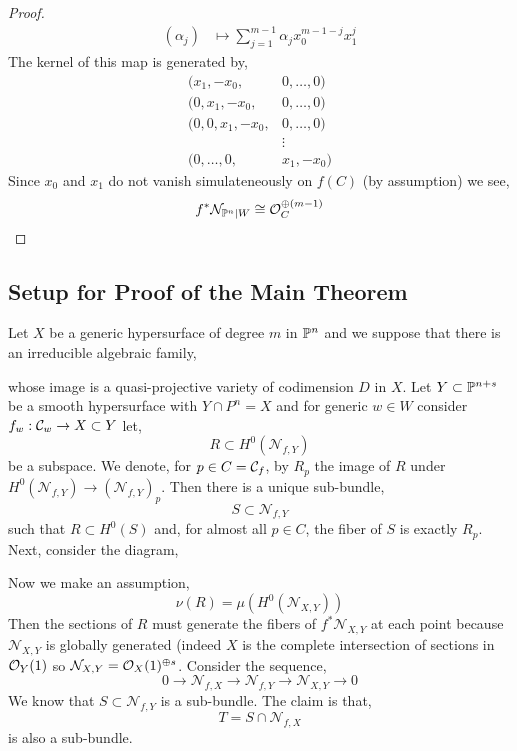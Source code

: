 \documentclass[12pt]{article}
\newcommand{\cN}{\mathcal{N}}
\begin{document}
\begin{proof}
\begin{align*}
(\alpha_j) & \mapsto \sum_{j = 1}^{m-1} \alpha_j x_0^{m-1-j} x_1^j 
\end{align*}
The kernel of this map is generated by,
\begin{align*}
(x_1, -x_0, & 0, \dots, 0) 
\\
(0, x_1, -x_0, & 0, \dots, 0) 
\\
(0, 0, x_1, - x_0, & 0, \dots, 0)
\\
& \vdots
\\
(0, \dots, 0, & x_1, -x_0)
\end{align*}
Since $x_0$ and $x_1$ do not vanish simulateneously on $f(C)$ (by assumption) we see,
\[ f^* \cN_{\P^n | W} \cong \struct{C}^{\oplus (m-1)} \]
\end{proof}

\subsection{Setup for Proof of the Main Theorem}

Let $X$ be a generic hypersurface of degree $m$ in $\P^n$ and we suppose that there is an irreducible algebraic family,
\begin{center}
\end{center}
whose image is a quasi-projective variety of codimension $D$ in $X$. Let $Y \subset \P^{n+s}$ be a smooth hypersurface with $Y \cap P^n = X$ and for generic $w \in W$ consider $f_w : \C_w \to X \subset Y$ let,
\[ R \subset H^0(\cN_{f, Y}) \]
be a subspace. We denote, for $p \in C = \C_f$, by $R_p$ the image of $R$ under $H^0(\cN_{f,Y}) \to (\cN_{f,Y})_p$. Then there is a unique sub-bundle,
\[ S \subset \cN_{f,Y} \]
such that $R \subset H^0(S)$ and, for almost all $p \in C$, the fiber of $S$ is exactly $R_p$. Next, consider the diagram,
\begin{center}
\end{center}
Now we make an assumption,
\begin{equation}
\nu(R) = \mu(H^0(\cN_{X,Y})) \tag{$*$}
\end{equation}
Then the sections of $R$ must generate the fibers of $f^* \cN_{X,Y}$ at each point because $\cN_{X,Y}$ is globally generated (indeed $X$ is the complete intersection of sections in $\struct{Y}(1)$ so $\cN_{X,Y} = \struct{X}(1)^{\oplus s}$.  Consider the sequence,
\[ 0 \to \cN_{f,X} \to \cN_{f,Y} \to \cN_{X,Y} \to 0 \]
We know that $S \subset \cN_{f,Y}$ is a sub-bundle. The claim is that,
\[ T = S \cap \cN_{f,X} \]
is also a sub-bundle. 
\end{document}
